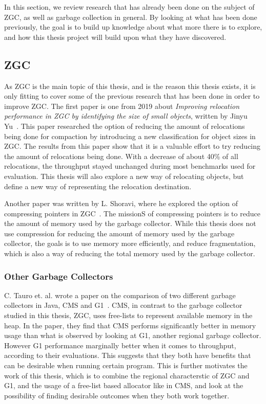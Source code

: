 

In this section, we review research that has already been done on the subject of ZGC, as well as garbage collection in general. By looking at what has been done previously, the goal is to build up knowledge about what more there is to explore, and how this thesis project will build upon what they have discovered. 

\subsection{ZGC}
As ZGC is the main topic of this thesis, and is the reason this thesis exists, it is only fitting to cover some of the previous research that has been done in order to improve ZGC. The first paper is one from 2019 about \textit{Improving relocation performance in ZGC by identifying the size of small objects}, written by Jinyu Yu~\cite{zgc:yu}. This paper researched the option of reducing the amount of relocations being done for compaction by introducing a new classification for object sizes in ZGC. The results from this paper show that it is a valuable effort to try reducing the amount of relocations being done. With a decrease of about 40\% of all relocations, the throughput stayed unchanged during most benchmarks used for evaluation. This thesis will also explore a new way of relocating objects, but define a new way of representing the relocation destination.

Another paper was written by L. Shoravi, where he explored the option of compressing pointers in ZGC~\cite{zgc:shoravi}. The missionS of compressing pointers is to reduce the amount of memory used by the garbage collector. While this thesis does not use compression for reducing the amount of memory used by the garbage collector, the goals is to use memory more efficiently, and reduce fragmentation, which is also a way of reducing the total memory used by the garbage collector.

\subsubsection{Other Garbage Collectors}
C. Tauro et. al. wrote a paper on the comparison of two different garbage collectors in Java, CMS and G1~\cite{gc:tauro}. CMS, in contrast to the garbage collector studied in this thesis, ZGC, uses free-lists to represent available memory in the heap. In the paper, they find that CMS performs significantly better in memory usage than what is observed by looking at G1, another regional garbage collector. However G1 performance marginally better when it comes to throughput, according to their evaluations. This suggests that they both have benefits that can be desirable when running certain program. This is further motivates the work of this thesis, which is to combine the regional characterstic of ZGC and G1, and the usage of a free-list based allocator like in CMS, and look at the possibility of finding desirable outcomes when they both work together.